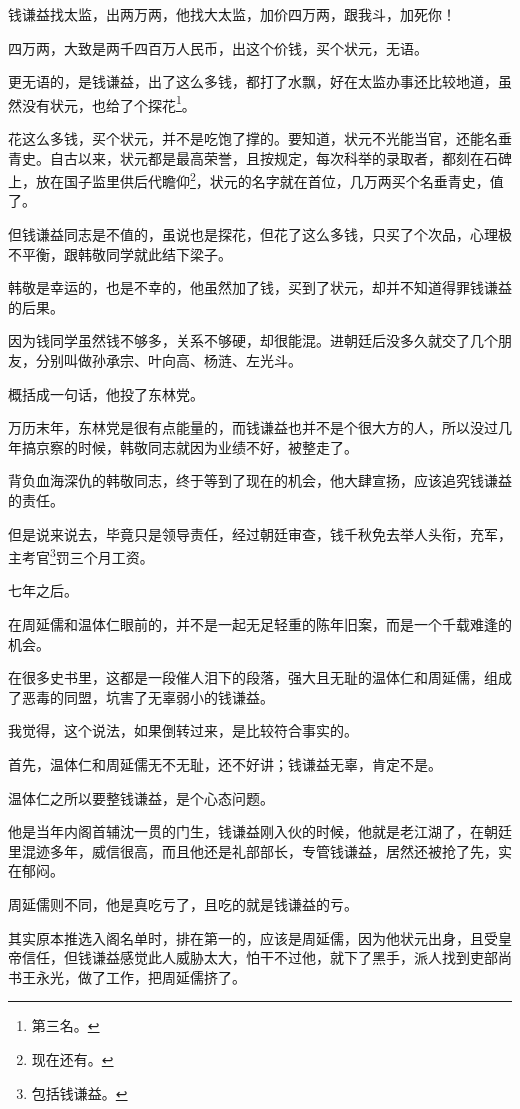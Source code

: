 \begin{multicols}{\theparacolNo}
		钱谦益找太监，出两万两，他找大太监，加价四万两，跟我斗，加死你！

		四万两，大致是两千四百万人民币，出这个价钱，买个状元，无语。

		更无语的，是钱谦益，出了这么多钱，都打了水飘，好在太监办事还比较地道，虽然没有状元，也给了个探花\footnote{第三名。}。

		花这么多钱，买个状元，并不是吃饱了撑的。要知道，状元不光能当官，还能名垂青史。自古以来，状元都是最高荣誉，且按规定，每次科举的录取者，都刻在石碑上，放在国子监里供后代瞻仰\footnote{现在还有。}，状元的名字就在首位，几万两买个名垂青史，值了。

		但钱谦益同志是不值的，虽说也是探花，但花了这么多钱，只买了个次品，心理极不平衡，跟韩敬同学就此结下梁子。

		韩敬是幸运的，也是不幸的，他虽然加了钱，买到了状元，却并不知道得罪钱谦益的后果。

		因为钱同学虽然钱不够多，关系不够硬，却很能混。进朝廷后没多久就交了几个朋友，分别叫做孙承宗、叶向高、杨涟、左光斗。

		概括成一句话，他投了东林党。

		万历末年，东林党是很有点能量的，而钱谦益也并不是个很大方的人，所以没过几年搞京察的时候，韩敬同志就因为业绩不好，被整走了。

		背负血海深仇的韩敬同志，终于等到了现在的机会，他大肆宣扬，应该追究钱谦益的责任。

		但是说来说去，毕竟只是领导责任，经过朝廷审查，钱千秋免去举人头衔，充军，主考官\footnote{包括钱谦益。}罚三个月工资。

		七年之后。

		在周延儒和温体仁眼前的，并不是一起无足轻重的陈年旧案，而是一个千载难逢的机会。

		在很多史书里，这都是一段催人泪下的段落，强大且无耻的温体仁和周延儒，组成了恶毒的同盟，坑害了无辜弱小的钱谦益。

		我觉得，这个说法，如果倒转过来，是比较符合事实的。

		首先，温体仁和周延儒无不无耻，还不好讲；钱谦益无辜，肯定不是。

		温体仁之所以要整钱谦益，是个心态问题。

		他是当年内阁首辅沈一贯的门生，钱谦益刚入伙的时候，他就是老江湖了，在朝廷里混迹多年，威信很高，而且他还是礼部部长，专管钱谦益，居然还被抢了先，实在郁闷。

		周延儒则不同，他是真吃亏了，且吃的就是钱谦益的亏。

		其实原本推选入阁名单时，排在第一的，应该是周延儒，因为他状元出身，且受皇帝信任，但钱谦益感觉此人威胁太大，怕干不过他，就下了黑手，派人找到吏部尚书王永光，做了工作，把周延儒挤了。


\end{multicols}
